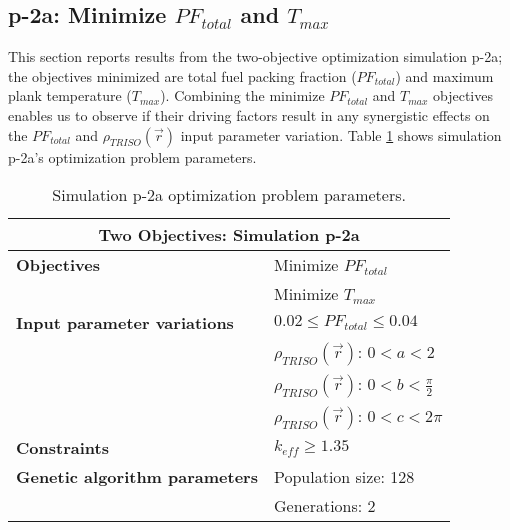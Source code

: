 \subsection{p-2a: Minimize $PF_{total}$ and $T_{max}$}
\label{sec:p-2a}
This section reports results from the two-objective optimization simulation p-2a; the 
objectives minimized are total fuel packing fraction ($PF_{total}$) and maximum plank
temperature ($T_{max}$).  
Combining the minimize $PF_{total}$ and $T_{max}$ objectives enables us to observe if 
their driving factors result in any synergistic effects on the $PF_{total}$ and 
$\rho_{TRISO}(\vec{r})$ input parameter variation. 
Table \ref{tab:simulationp2a} shows simulation p-2a's optimization problem parameters.
\begin{table}[htbp!]
    \centering
    \onehalfspacing
    \caption{Simulation p-2a optimization problem parameters.}
	\label{tab:simulationp2a}
    \footnotesize
    \begin{tabular}{l|p{4cm}}
    \hline 
    \multicolumn{2}{c}{\textbf{Two Objectives: Simulation p-2a}} \\
    \hline 
    \textbf{Objectives} & Minimize $PF_{total}$ \\
    & Minimize $T_{max}$ \\
    \hline 
    \textbf{Input parameter variations} & $0.02 \leq PF_{total} \leq 0.04$ \\
    & $\rho_{TRISO}(\vec{r})$: $0<a<2$ \\
    & $\rho_{TRISO}(\vec{r})$: $0<b<\frac{\pi}{2}$ \\
    & $\rho_{TRISO}(\vec{r})$: $0<c<2\pi$ \\
    \hline
    \textbf{Constraints} & $k_{eff} \geq 1.35$\\ 
    \hline 
    \textbf{Genetic algorithm parameters} & Population size: 128 \\
    & Generations: 2 \\
    \hline
    \end{tabular}
\end{table}

